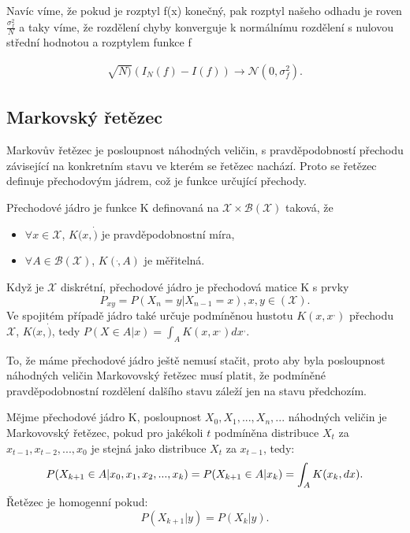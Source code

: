 \documentclass[czech,master,public,dept470,male,cpdeclaration,oneside, python]{diploma}
\begin{document}
Navíc víme, že pokud je rozptyl f(x) konečný, pak rozptyl našeho odhadu je roven $\frac{\sigma^2_f}{N}$ a taky víme, že rozdělení chyby konverguje k normálnímu rozdělení s nulovou střední hodnotou a rozptylem funkce f \cite{andrieu2003introduction} \par 

\begin{align}
	\sqrt{N)}(I_N(f) - I(f)) \to \mathcal{N}(0, \sigma^2_f).
\end{align}
\subsection{Markovský řetězec}
Markovův řetězec je posloupnost náhodných veličin, s pravděpodobností přechodu závisející na konkretním stavu ve kterém se řetězec nachází. Proto se řetězec definuje přechodovým jádrem, což je funkce určující přechody. 

\begin{definition}
	Přechodové jádro je funkce K definovaná na $\mathcal{X} \times \mathcal{B}(\mathcal{X})$ taková, že 
	\begin{itemize}
	\item $\forall x \in \mathcal{X}$, $K(x, \dot)$ je pravděpodobnostní míra,
	\item $\forall A \in \mathcal{B}(\mathcal{X})$, $K(\dot, A)$ je měřitelná.
	\end{itemize}

	Když je $\mathcal{X}$ diskrétní, přechodové jádro je přechodová matice K s prvky
	\begin{equation*}
		P_{xy} = P(X_n = y| X_{n-1} = x), x, y \in (\mathcal{X}).
	\end{equation*}
	Ve spojitém případě jádro také určuje podmíněnou hustotu $K(x, x^{,})$ přechodu $\mathcal{X}$, $K(x, \dot)$, tedy $P(X \in A| x) = \int_A K(x, x^{,}) dx^{,}$. 
\end{definition}

To, že máme přechodové jádro ještě nemusí stačit, proto aby byla posloupnost náhodných veličin Markovovský řetězec musí platit, že podmíněné pravděpodobnostní rozdělení dalšího stavu záleží jen na stavu předchozím.

\begin{definition}
	Mějme přechodové jádro K, posloupnost $X_0, X_1, ..., X_n, ...$ náhodných veličin je Markovovský řetězec, pokud pro jakékoli $t$ podmíněna distribuce $X_t$ za $x_{t-1}, x_{t-2}, ..., x_0$ je stejná jako distribuce $X_t$ za $x_{t-1}$, tedy:
	\begin{equation*}
		P(X_{k+1} \in A| x_0, x_1, x_2, ... , x_k) = P(X_{k+1} \in A| x_k) \\
		= \int_A K(x_k, dx).
	\end{equation*}
	Řetězec je homogenní pokud:
	\begin{equation*}
		P(X_{k+1} | y) = P(X_k | y).
	\end{equation*}
\end{definition} \par
\end{document}
